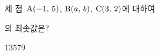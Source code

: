 세 점~$\mathrm{A}(-1,\mkern3mu 5)$, $\mathrm{B}(a,\mkern3mu b)$, $\mathrm{C}(3,\mkern3mu 2)$에 대하여\par\smallskip{}\par\smallskip\noindent 의 최솟값은?
\begin{choices32}{$1$}{$3$}{$5$}{$7$}{$9$}\end{choices32}
